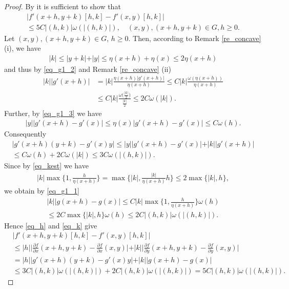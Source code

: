 \documentclass[10pt,a4paper]{amsart}
\theoremstyle{definition}
\begin{document}
\begin{proof}
By \cite[Lemma 2.3]{KZ} it is sufficient to show that
\begin{multline*}
\vert f'(x+h,y+k)[h,k]-f'(x,y)[h,k]\vert\\\leq 5C\vert (h,k)\vert\omega(\vert (h,k)\vert),\quad (x,y),(x+h,y+k)\in G, h\geq 0.
\end{multline*}
Let $ (x,y),(x+h,y+k)\in G $, $ h\geq 0 $. Then, according to Remark \ref{re_concave} (i), we have
\begin{align}\label{eq_kest}
\vert k\vert\leq\vert y+k\vert+\vert y\vert\leq\eta(x+h)+\eta(x)\leq 2\eta(x+h)
\end{align}
and thus by \eqref{eq_g1_2} and Remark \ref{re_concave} (ii)
\begin{align*}
\vert k\vert\vert g'(x+h)\vert&=\vert k\vert\frac{\eta(x+h)\vert g'(x+h)\vert}{\eta(x+h)}\leq C\vert k\vert\frac{\omega(\eta(x+h))}{\eta(x+h)}\\
&\leq C\vert k\vert\frac{\omega\big(\frac{\vert k\vert}{2}\big)}{\frac{\vert k\vert}{2}}\leq 2C\omega(\vert k\vert).
\end{align*}
Further, by \eqref{eq_g1_3} we have
\begin{align*}
\vert y\vert\vert g'(x+h)-g'(x)\vert\leq\eta(x)\vert g'(x+h)-g'(x)\vert\leq C\omega(h).
\end{align*}
Consequently
\begin{multline}\label{eq_h}
\vert g'(x+h)(y+k)-g'(x)y\vert\leq\vert y\vert\vert g'(x+h)-g'(x)\vert+\vert k\vert\vert g'(x+h)\vert\\
\leq C\omega(h)+2C\omega(\vert k\vert)\leq 3C\omega(\vert (h,k)\vert).
\end{multline}
Since by \eqref{eq_kest} we have
\begin{align*}
\vert k\vert\max\bigg\lbrace 1,\frac{h}{\eta(x+h)}\bigg\rbrace=\max\bigg\lbrace\vert k\vert,\frac{\vert k\vert}{\eta(x+h)}h\bigg\rbrace\leq 2\max\lbrace\vert k\vert,h\rbrace,
\end{align*}
we obtain by \eqref{eq_g1_1}
\begin{multline}\label{eq_k}
\vert k\vert\vert g(x+h)-g(x)\vert\leq C\vert k\vert\max\bigg\lbrace 1,\frac{h}{\eta(x+h)}\bigg\rbrace\omega(h)\\
\leq 2C\max\lbrace\vert k\vert,h\rbrace\omega(h)\leq 2C\vert (h,k)\vert\omega(\vert (h,k)\vert).
\end{multline}
Hence \eqref{eq_h} and \eqref{eq_k} give
\begin{align*}
&\vert f'(x+h,y+k)[h,k]-f'(x,y)[h,k]\vert\\
&\leq\vert h\vert\bigg\vert\frac{\partial f}{\partial x}(x+h,y+k)-\frac{\partial f}{\partial x}(x,y)\bigg\vert+\vert k\vert\bigg\vert\frac{\partial f}{\partial y}(x+h,y+k)-\frac{\partial f}{\partial y}(x,y)\bigg\vert\\
&=\vert h\vert\vert g'(x+h)(y+k)-g'(x)y\vert+\vert k\vert\vert g(x+h)-g(x)\vert\\
&\leq 3C\vert (h,k)\vert\omega(\vert (h,k)\vert)+2C\vert (h,k)\vert\omega(\vert (h,k)\vert)=5C\vert (h,k)\vert\omega(\vert (h,k)\vert).
\end{align*}
\end{proof}
\end{document}

